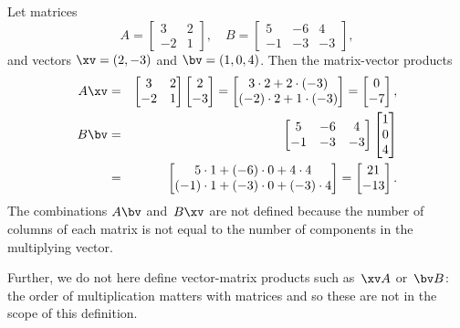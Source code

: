 \begin{example} \label{eg:matvecmul}
Let matrices
\begin{equation*}
A=\begin{bmatrix} 3 & 2\\ -2 & 1 \end{bmatrix},\quad
B=\begin{bmatrix} 5 & -6 & 4\\ -1 & -3 & -3 \end{bmatrix},
\end{equation*}
and vectors \(\xv=(2,-3)\) and \(\bv=(1,0,4)\).
Then the matrix-vector products
\begin{eqnarray*}
A\xv&=&\begin{bmatrix} 3 & 2\\ -2 & 1 \end{bmatrix}
\begin{bmatrix} 2\\-3 \end{bmatrix}
=\begin{bmatrix} 3\cdot2+2\cdot(-3)\\ (-2)\cdot2+1\cdot(-3) \end{bmatrix}
=\begin{bmatrix} 0\\ -7 \end{bmatrix},
\\
B\bv&=&\begin{bmatrix} 5 & -6 & 4\\ -1 & -3 & -3 \end{bmatrix}
\begin{bmatrix} 1\\0\\4 \end{bmatrix}
\\&=&\begin{bmatrix} 5\cdot1+(-6)\cdot0 + 4\cdot4\\ (-1)\cdot1 + (-3)\cdot0 + (-3)\cdot4 \end{bmatrix}
=\begin{bmatrix} 21\\-13 \end{bmatrix}.
\end{eqnarray*}
The combinations \(A\bv\) and~\(B\xv\) are not defined because the number of columns of each matrix is not equal to the number of components in the multiplying vector.

Further, we do not here define vector-matrix products such as~\(\xv A\) or~\(\bv B\): the order of multiplication matters with matrices and so these are not in the scope of this definition.
\end{example}



